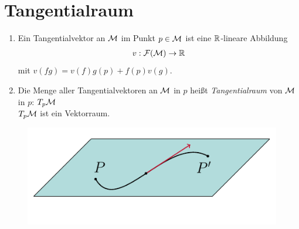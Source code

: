 \section{Tangentialraum} 


\begin{defs}
\begin{enumerate}
\item Ein Tangentialvektor an $\mathcal{M}$ im Punkt $p \in \mathcal{M}$ ist eine $\mathbb{R}$-lineare Abbildung
\begin{align*}
v: \mathcal{F}(\mathcal{M}) \rightarrow \mathbb{R}
\end{align*}
mit $v(fg) = v(f)g(p) + f(p)v(g)$.
\item Die Menge aller Tangentialvektoren an $\mathcal{M}$ in $p$ heißt \textit{Tangentialraum} von $\mathcal{M}$ in $p$: $T_p \mathcal{M}$\\
$T_p \mathcal{M}$ ist ein Vektorraum.
\end{enumerate}

\begin{figure}[H]
\centering
\includegraphics[scale=1]{figures/tikz/tangentline.pdf}
\end{figure}
\end{defs}
